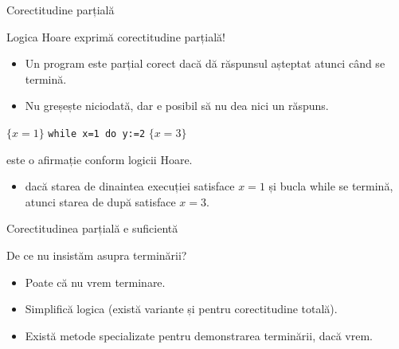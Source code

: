 \begin{frame}{Corectitudine parțială}

Logica Hoare exprimă \alert{corectitudine parțială}!
\begin{itemize}
	\item Un program este \alert{parțial corect} dacă dă răspunsul așteptat atunci când se termină.
	\item Nu greșește niciodată, dar e posibil să nu dea nici un răspuns.
\end{itemize}

\medskip \pause
\begin{example}
\vspace{-.2cm}
\begin{center}
$\{x=1\}$ \texttt{while x=1 do y:=2} $\{x=3\}$
\end{center}
este o afirmație  conform logicii Hoare.
\begin{itemize}
	\item dacă starea de dinaintea execuției satisface $x=1$ \alert{și} bucla while se termină, atunci starea de după satisface $x=3$. 
\end{itemize}

\end{example}
\end{frame}

\begin{frame}{Corectitudinea parțială e suficientă}

\alert{De ce nu insistăm asupra terminării?}
\begin{itemize}
	\item Poate că nu vrem terminare.
	\item Simplifică logica (există variante și pentru corectitudine totală).
	\item Există metode specializate pentru demonstrarea terminării, dacă vrem.
\end{itemize}

\end{frame}


